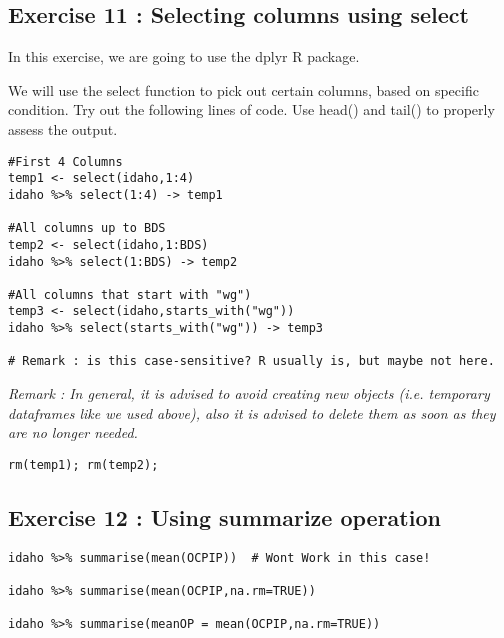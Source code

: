 \documentclass{article}
\begin{document}
\newpage
\subsection*{Exercise 11 : Selecting columns using select}

In this exercise, we are going to use the dplyr R package. 

We will use the select function to pick out certain columns, based on specific condition. Try out the following lines of code. Use head() and tail() to properly assess the output.

\begin{framed}
\begin{verbatim}
#First 4 Columns
temp1 <- select(idaho,1:4)
idaho %>% select(1:4) -> temp1

#All columns up to BDS
temp2 <- select(idaho,1:BDS)
idaho %>% select(1:BDS) -> temp2

#All columns that start with "wg")
temp3 <- select(idaho,starts_with("wg"))
idaho %>% select(starts_with("wg")) -> temp3

# Remark : is this case-sensitive? R usually is, but maybe not here.

\end{verbatim}
\end{framed}

\noindent \textit{Remark : In general, it is advised to avoid creating new objects (i.e. temporary dataframes like we used above), also it is advised to delete them as soon as they are no longer needed.}

\begin{framed}
\begin{verbatim}
rm(temp1); rm(temp2);
\end{verbatim}
\end{framed}



\subsection*{Exercise 12 : Using summarize operation}


\begin{framed}
\begin{verbatim}
idaho %>% summarise(mean(OCPIP))  # Wont Work in this case!

idaho %>% summarise(mean(OCPIP,na.rm=TRUE))

idaho %>% summarise(meanOP = mean(OCPIP,na.rm=TRUE))
\end{verbatim}
\end{framed}
\end{document}
